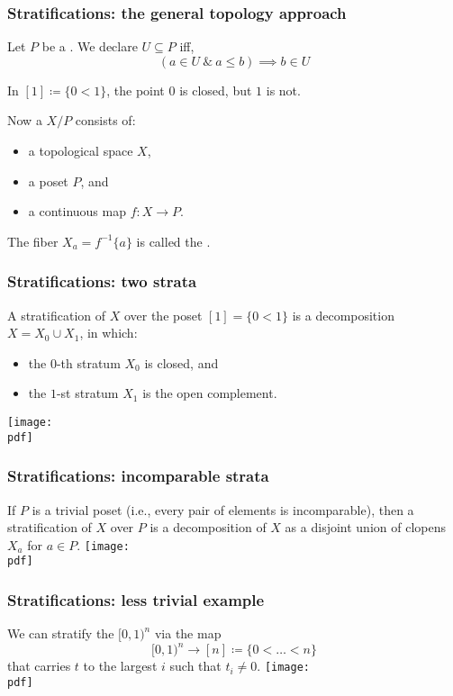 \documentclass[11pt,xcolor={dvipsnames},hyperref={pdftex,pdfpagemode=UseNone,hidelinks,pdfdisplaydoctitle=true},usepdftitle=false]{beamer}
\newcommand{\pdf}{figures.pdf}
\begin{document}
\begin{frame}
  \frametitle{Stratifications: the general topology approach}
  Let $P$ be a .
  We declare $U \subseteq P$  iff,
  \[
    (a \in U\ \&\ a \leq b) \implies b \in U
  \]

  \begin{example}
    In $[1] \coloneq \{0 < 1\}$, the point $0$ is closed, but $1$ is not.
  \end{example}

  Now a  $X/P$ consists of:
  \begin{itemize}
    \item a topological space $X$,
    \item a poset $P$, and
    \item a continuous map $f \colon X \to P$.
  \end{itemize}
  The fiber $X_a = f^{-1}\{a\}$ is called the .
\end{frame}

\begin{frame}
  \frametitle{Stratifications: two strata}
  \begin{example}
    A stratification of $X$ over the poset $[1] = \{0 < 1\}$ is a decomposition $X = X_0 \cup X_1$, in which:
    \begin{itemize}
      \item the $0$-th stratum $X_0$ is closed, and
      \item the $1$-st stratum $X_1$ is the open complement.
    \end{itemize}
    \texttt{[image: \\pdf]}%
  \end{example}
\end{frame}

\begin{frame}
  \frametitle{Stratifications: incomparable strata}
  \begin{example}
    If $P$ is a trivial poset (i.e., every pair of elements is incomparable), then
    a stratification of $X$ over $P$ is a decomposition of $X$ as a disjoint union of clopens $X_a$ for $a \in P$.
    \texttt{[image: \\pdf]}%
  \end{example}
\end{frame}

\begin{frame}
  \frametitle{Stratifications: less trivial example}
  \begin{example}
    We can stratify the  $[0,1)^n$ via the map
    \[
      [0,1)^n \to [n] \coloneq \{0 < \dots < n\} 
    \]
    that carries $t$ to the largest $i$ such that $t_i \neq 0$.
    \texttt{[image: \\pdf]}%
  \end{example}
\end{frame}
\end{document}
